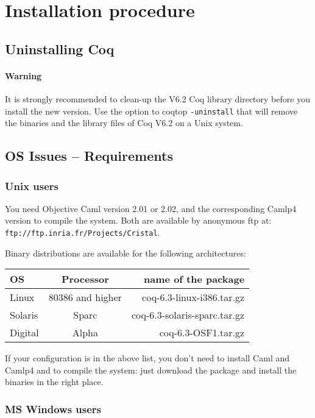 \documentclass[11pt]{article}
\begin{document}
\section{Installation procedure}

\subsection{Uninstalling Coq}

\paragraph{Warning} 
It is strongly recommended to clean-up the V6.2 Coq library directory
before you install the new version.
Use the option to coqtop \texttt{-uninstall} that will remove
the binaries and the library files of Coq V6.2 on a Unix system.

\subsection{OS Issues -- Requirements}

\subsubsection{Unix users}
You need Objective Caml version 2.01 or 2.02, and the corresponding 
Camlp4 version to compile the system. Both are available by anonymous ftp
at: \\
\verb|ftp://ftp.inria.fr/Projects/Cristal|.
\bigskip

\noindent
Binary distributions are available for the following architectures:

\bigskip
\begin{tabular}{l|c|r}
{\bf OS } & {\bf Processor} & {name of the package}\\
\hline
Linux & 80386 and higher & coq-6.3-linux-i386.tar.gz \\
Solaris & Sparc & coq-6.3-solaris-sparc.tar.gz\\
Digital & Alpha & coq-6.3-OSF1.tar.gz\\
\end{tabular}
\bigskip

If your configuration is in the above list, you don't need to install
Caml and Camlp4 and to compile the system: 
just download the package and install the binaries in the right place.

\subsubsection{MS Windows users}
\end{document}
